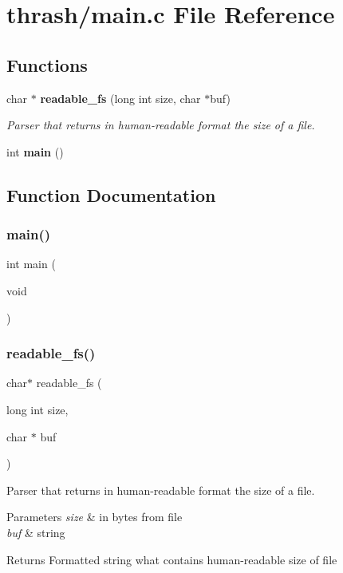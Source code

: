 \section{thrash/main.c File Reference}
\label{main_8c}
\subsection*{Functions}
\begin{DoxyCompactItemize}
\item 
char $\ast$ \textbf{ readable\+\_\+fs} (long int size, char $\ast$buf)
\begin{DoxyCompactList}\small\item\em Parser that returns in human-\/readable format the size of a file. \end{DoxyCompactList}\item 
int \textbf{ main} ()
\end{DoxyCompactItemize}


\subsection{Function Documentation}
\mbox{\label{main_8c_ae66f6b31b5ad750f1fe042a706a4e3d4}} 
\subsubsection{main()}
{\footnotesize\ttfamily int main (\begin{DoxyParamCaption}\item[{void}]{ }\end{DoxyParamCaption})}

\mbox{\label{main_8c_acb8985a720cf17b68e99872ba793f2cc}} 
\subsubsection{readable\+\_\+fs()}
{\footnotesize\ttfamily char$\ast$ readable\+\_\+fs (\begin{DoxyParamCaption}\item[{long int}]{size,  }\item[{char $\ast$}]{buf }\end{DoxyParamCaption})}



Parser that returns in human-\/readable format the size of a file. 


\begin{DoxyParams}{Parameters}
{\em size} & in bytes from file \\
\hline
{\em buf} & string \\
\hline
\end{DoxyParams}
\begin{DoxyReturn}{Returns}
Formatted string what contains human-\/readable size of file 
\end{DoxyReturn}
